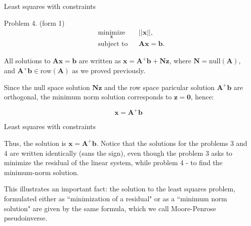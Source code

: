 \documentclass{beamer}
\begin{document}
\begin{frame}{Least squares with constraints}
\begin{flushleft}


Problem 4. (form 1)
%
\begin{equation}
\begin{aligned}
& \underset{\mathbf{x}}{\text{minimize}}
& & || \mathbf{x} ||, \\
& \text{subject to}
& & \mathbf{A} \mathbf{x} = \mathbf{b}.
\end{aligned}
\end{equation}


All solutions to $\mathbf{A} \mathbf{x} = \mathbf{b}$ are written as $\mathbf{x} = \mathbf{A}^+\mathbf{b} + \mathbf{N}\mathbf{z}$, where $\mathbf{N} = \text{null}(\mathbf{A})$, and $\mathbf{A}^+\mathbf{b} \in \text{row}(\mathbf{A})$ as we proved previously. 

\bigskip

Since the null space solution $\mathbf{N}\mathbf{z}$ and the row space paricular solution $\mathbf{A}^+\mathbf{b}$ are orthogonal, the minimum norm solution corresponds to $\mathbf{z} = \mathbf{0}$, hence:

\begin{equation}
	\mathbf{x} = \mathbf{A}^+\mathbf{b}
\end{equation}

\end{flushleft}
\end{frame}

\begin{frame}{Least squares with constraints}
\begin{flushleft}


Thus, the solution is  $\mathbf{x} = \mathbf{A}^+\mathbf{b}$. Notice that the solutions for the problems 3 and 4 are written identically (sans the sign), even though the problem 3 asks to minimize the residual of the linear system, while problem 4 - to find the minimum-norm solution. 

\bigskip

This illustrates an important fact: the solution to the least squares problem, formulated either as ``minimization of a residual" or as a ``minimum norm solution" are given by the same formula, which we call Moore-Penrose pseudoinverse.


\end{flushleft}
\end{frame}
\end{document}
